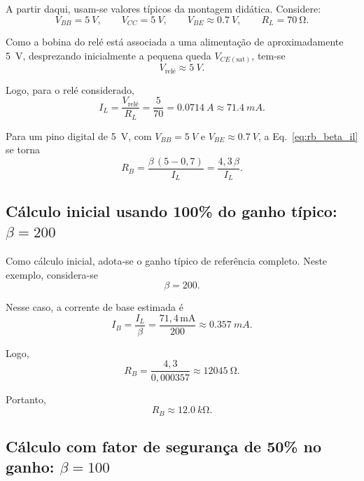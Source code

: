 \documentclass[12pt,a4paper]{article}
\newcommand{\Vcc}{V_{CC}}
\newcommand{\Vbb}{V_{BB}}
\newcommand{\Vbe}{V_{BE}}
\newcommand{\Vcesat}{V_{CE(\mathrm{sat})}}
\newcommand{\Ib}{I_B}
\newcommand{\Il}{I_L}
\newcommand{\Rb}{R_B}
\newcommand{\Rl}{R_L}
\begin{document}
A partir daqui, usam-se valores típicos da montagem didática. Considere:
\begin{equation}
\Vbb = \SI{5}{V},
\qquad
\Vcc = \SI{5}{V},
\qquad
\Vbe \approx \SI{0,7}{V},
\qquad
\Rl = \SI{70}{\ohm}.
\end{equation}

Como a bobina do relé está associada a uma alimentação de aproximadamente \SI{5}{V}, desprezando inicialmente a pequena queda $\Vcesat$, tem-se
\begin{equation}
V_{\text{relé}} \approx \SI{5}{V}.
\end{equation}

Logo, para o relé considerado,
\begin{equation}
\Il = \frac{V_{\text{relé}}}{\Rl}
= \frac{5}{70}
= \SI{0,0714}{A}
\approx \SI{71,4}{mA}.
\label{eq:il_srd_70}
\end{equation}

Para um pino digital de \SI{5}{V}, com $\Vbb = \SI{5}{V}$ e $\Vbe \approx \SI{0,7}{V}$, a Eq.~\eqref{eq:rb_beta_il} se torna
\begin{equation}
\Rb = \frac{\beta\,(5 - 0,7)}{\Il}
= \frac{4,3\,\beta}{\Il}.
\label{eq:rb_43}
\end{equation}


\subsection{Cálculo inicial usando 100\% do ganho típico: \texorpdfstring{$\beta = 200$}{beta = 200}}

Como cálculo inicial, adota-se o ganho típico de referência completo. Neste exemplo, considera-se
\begin{equation}
\beta = 200.
\end{equation}

Nesse caso, a corrente de base estimada é
\begin{equation}
\Ib = \frac{\Il}{\beta}
= \frac{71,4\,\mathrm{mA}}{200}
\approx \SI{0,357}{mA}.
\end{equation}

Logo,
\begin{equation}
\Rb = \frac{4,3}{0,000357}
\approx \SI{12045}{\ohm}.
\end{equation}

Portanto,
\begin{equation}
\boxed{\Rb \approx \SI{12,0}{k\ohm}}.
\end{equation}

\subsection{Cálculo com fator de segurança de 50\% no ganho: \texorpdfstring{$\beta = 100$}{beta = 100}}
\end{document}
